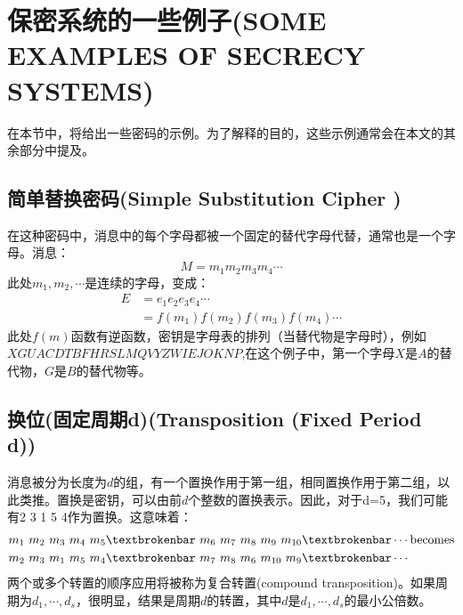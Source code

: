 \documentclass[]{article}
\begin{document}
\newpage

%   
%

\section{保密系统的一些例子(SOME EXAMPLES OF SECRECY SYSTEMS)}

在本节中，将给出一些密码的示例。为了解释的目的，这些示例通常会在本文的其余部分中提及。

\subsection{简单替换密码(Simple Substitution Cipher )}
在这种密码中，消息中的每个字母都被一个固定的替代字母代替，通常也是一个字母。消息：
\[M=m_1 m_2 m_3 m_4\cdots\]
此处$m_1,m_2,\cdots$是连续的字母，变成：
\begin{equation}
\begin{aligned}
	E &=e_1 e_2 e_3 e_4 \cdots \\
	&= f(m_1)f(m_2)f(m_3)f(m_4)\cdots\nonumber
\end{aligned}
\end{equation}
此处$f(m)$函数有逆函数，密钥是字母表的排列（当替代物是字母时），例如$X G U A C D T B F H R S L M Q V Y Z W I E J O K N P$,在这个例子中，第一个字母$X$是$A$的替代物，$G$是$B$的替代物等。


\subsection{换位(固定周期d)(Transposition (Fixed Period d))}
消息被分为长度为$d$的组，有一个置换作用于第一组，相同置换作用于第二组，以此类推。置换是密钥，可以由前$d$个整数的置换表示。因此，对于d=5，我们可能有2 3 1 5 4作为置换。这意味着：
\begin{equation}
	\begin{aligned}
		&m_1\ m_2\ m_3\ m_4\ m_5\textbrokenbar \ m_6\ m_7 \ m_8 \ m_9 \ m_{10}\textbrokenbar \cdots\text{becomes} \\
		&m_2\ m_3\ m_1\ m_5\ m_4\textbrokenbar \ m_7\ m_8 \ m_6 \ m_{10} \ m_9\textbrokenbar \cdots\nonumber
	\end{aligned}
\end{equation}
两个或多个转置的顺序应用将被称为复合转置(compound transposition)。如果周期为$d_1,\cdots,d_s$，很明显，结果是周期$d$的转置，其中$d$是$d_1,\cdots,d_s$的最小公倍数。
\end{document}
